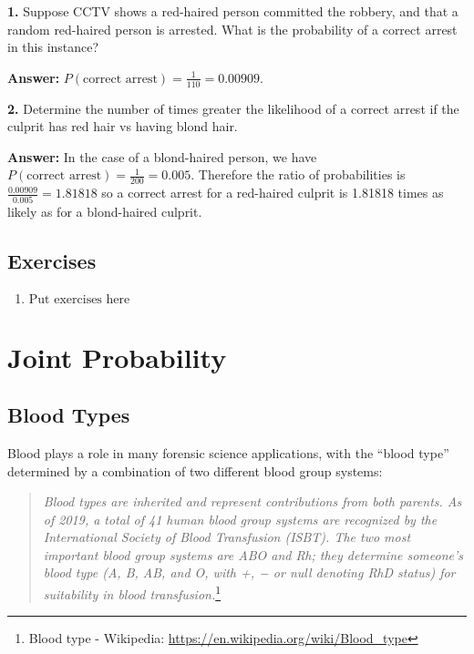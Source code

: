 \documentclass[
]{book}
\providecommand{\tightlist}{%
  \setlength{\itemsep}{0pt}\setlength{\parskip}{0pt}}
\begin{document}
\textbf{1.} Suppose CCTV shows a red-haired person committed the robbery, and that
a random red-haired person is arrested. What is the probability of a correct
arrest in this instance?

\textbf{Answer:} \(P(\text{correct arrest}) = \frac{1}{110} = 0.00909\).

\textbf{2.} Determine the number of times greater the likelihood of a correct arrest
if the culprit has red hair vs having blond hair.

\textbf{Answer:} In the case of a blond-haired person, we have
\(P(\text{correct arrest}) = \frac{1}{200} = 0.005\). Therefore the ratio
of probabilities is
\(\frac{0.00909}{0.005} = 1.81818\)
so a correct arrest for a red-haired culprit is 1.81818 times as likely
as for a blond-haired culprit.

\hypertarget{exercises}{%
\section{Exercises}\label{exercises}}

\begin{enumerate}
\def\labelenumi{\arabic{enumi}.}
\tightlist
\item
  \(\text{Put exercises here}\)
\end{enumerate}

\hypertarget{joint-probability}{%
\chapter{Joint Probability}\label{joint-probability}}

\hypertarget{blood-types}{%
\section{Blood Types}\label{blood-types}}

Blood plays a role in many forensic science applications, with the ``blood
type'' determined by a combination of two different blood group systems:

\begin{quote}
\emph{Blood types are inherited and represent contributions from both parents.
As of 2019, a total of 41 human blood group systems are recognized by the
International Society of Blood Transfusion (ISBT). The two most
important blood group systems are ABO and Rh; they determine someone's
blood type (A, B, AB, and O, with +, − or null denoting RhD status)
for suitability in blood transfusion.}\footnote{Blood type - Wikipedia: \url{https://en.wikipedia.org/wiki/Blood_type}}
\end{quote}
\end{document}
